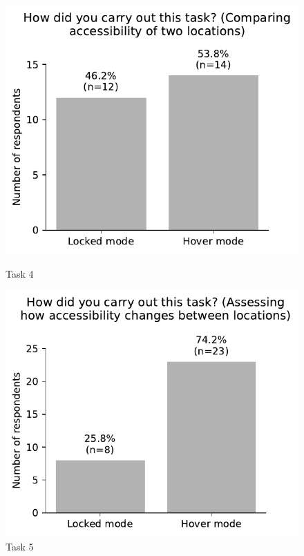 \begin{appendices}
\begin{figure}[H]
	\centering
	\begin{minipage}{0.5\textwidth}
		\centering
		\includegraphics[width=\textwidth]{visual/figures/survey/5.pdf}
		\caption{Task 4}
		\label{fig:task 4}
	\end{minipage}%
	\begin{minipage}{0.5\textwidth}
		\centering
		\includegraphics[width=\textwidth]{visual/figures/survey/6.pdf}
		\caption{Task 5}
		\label{fig:task 5}
	\end{minipage}
\end{figure}


\end{appendices}
